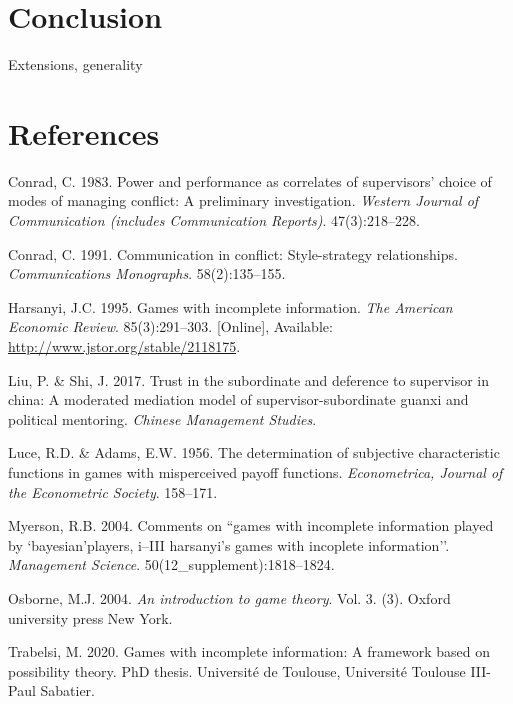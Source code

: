 \documentclass[11pt,preprint, authoryear]{elsarticle}
\numberwithin{equation}{section}
\numberwithin{figure}{section}
\numberwithin{table}{section}
\newlength{\cslhangindent}
\newenvironment{CSLReferences}%
  {\setlength{\parindent}{0pt}%
  \everypar{\setlength{\hangindent}{\cslhangindent}}\ignorespaces}%
  {\par}
\begin{document}
\hypertarget{conclusion}{%
\section{\texorpdfstring{Conclusion
\label{con}}{Conclusion }}\label{conclusion}}

Extensions, generality \newpage

\hypertarget{references}{%
\section*{References}\label{references}}

\hypertarget{refs}{}
\begin{CSLReferences}{1}{0}
\leavevmode\hypertarget{ref-power}{}%
Conrad, C. 1983. Power and performance as correlates of supervisors'
choice of modes of managing conflict: A preliminary investigation.
\emph{Western Journal of Communication (includes Communication
Reports)}. 47(3):218--228.

\leavevmode\hypertarget{ref-comm}{}%
Conrad, C. 1991. Communication in conflict: Style-strategy
relationships. \emph{Communications Monographs}. 58(2):135--155.

\leavevmode\hypertarget{ref-harsanyi}{}%
Harsanyi, J.C. 1995. Games with incomplete information. \emph{The
American Economic Review}. 85(3):291--303. {[}Online{]}, Available:
\url{http://www.jstor.org/stable/2118175}.

\leavevmode\hypertarget{ref-trust}{}%
Liu, P. \& Shi, J. 2017. Trust in the subordinate and deference to
supervisor in china: A moderated mediation model of
supervisor-subordinate guanxi and political mentoring. \emph{Chinese
Management Studies}.

\leavevmode\hypertarget{ref-luce1956}{}%
Luce, R.D. \& Adams, E.W. 1956. The determination of subjective
characteristic functions in games with misperceived payoff functions.
\emph{Econometrica, Journal of the Econometric Society}. 158--171.

\leavevmode\hypertarget{ref-2004com}{}%
Myerson, R.B. 2004. Comments on ``games with incomplete information
played by `bayesian'players, i--III harsanyi's games with incoplete
information''. \emph{Management Science}. 50(12\_supplement):1818--1824.

\leavevmode\hypertarget{ref-book}{}%
Osborne, M.J. 2004. \emph{An introduction to game theory}. Vol. 3. (3).
Oxford university press New York.

\leavevmode\hypertarget{ref-2020games}{}%
Trabelsi, M. 2020. Games with incomplete information: A framework based
on possibility theory. PhD thesis. Universit{é} de Toulouse,
Universit{é} Toulouse III-Paul Sabatier.

\end{CSLReferences}
\end{document}
